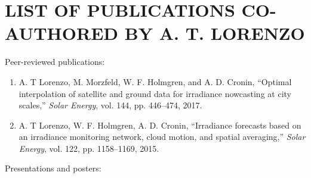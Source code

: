 \chapter{LIST OF PUBLICATIONS CO-AUTHORED BY A. T. LORENZO}
Peer-reviewed publications:
\begin{enumerate}
\item A. T Lorenzo, M. Morzfeld, W. F. Holmgren, and A. D. Cronin,
  ``Optimal interpolation of satellite and ground data for
    irradiance nowcasting at city scales,'' \emph{Solar Energy},
    vol. 144, pp. 446--474, 2017.

\item A. T Lorenzo, W. F. Holmgren, A. D. Cronin, ``Irradiance
  forecasts based on an irradiance monitoring network, cloud motion,
  and spatial averaging,'' \emph{Solar Energy}, vol. 122,
  pp. 1158--1169, 2015.

\end{enumerate}



\noindent Presentations and posters:

